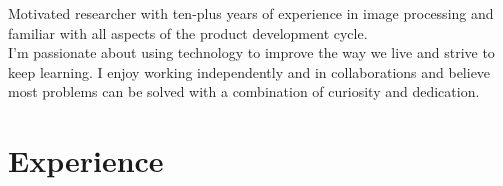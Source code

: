 \documentclass[letterpaper]{twentysecondcv} %
\begin{document}
\makeprofile


Motivated researcher with ten-plus years of experience in image processing and familiar with all aspects of the product development cycle. \\
I'm passionate about using technology to improve the way we live and strive to keep learning. I enjoy working independently and in collaborations and believe most problems can be solved with a combination of curiosity and dedication.

\section{Experience}
\end{document}
